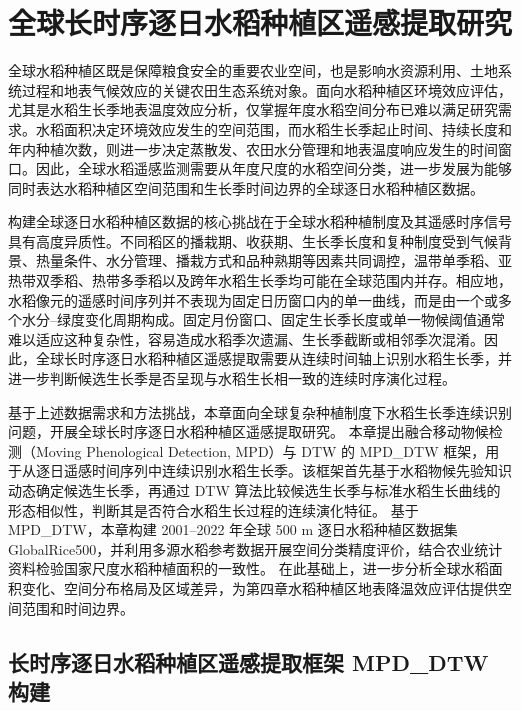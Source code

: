 \chapter{全球长时序逐日水稻种植区遥感提取研究}
全球水稻种植区既是保障粮食安全的重要农业空间，也是影响水资源利用、土地系统过程和地表气候效应的关键农田生态系统对象。面向水稻种植区环境效应评估，尤其是水稻生长季地表温度效应分析，仅掌握年度水稻空间分布已难以满足研究需求。水稻面积决定环境效应发生的空间范围，而水稻生长季起止时间、持续长度和年内种植次数，则进一步决定蒸散发、农田水分管理和地表温度响应发生的时间窗口。因此，全球水稻遥感监测需要从年度尺度的水稻空间分类，进一步发展为能够同时表达水稻种植区空间范围和生长季时间边界的全球逐日水稻种植区数据。

构建全球逐日水稻种植区数据的核心挑战在于全球水稻种植制度及其遥感时序信号具有高度异质性。不同稻区的播栽期、收获期、生长季长度和复种制度受到气候背景、热量条件、水分管理、播栽方式和品种熟期等因素共同调控，温带单季稻、亚热带双季稻、热带多季稻以及跨年水稻生长季均可能在全球范围内并存。相应地，水稻像元的遥感时间序列并不表现为固定日历窗口内的单一曲线，而是由一个或多个水分--绿度变化周期构成。固定月份窗口、固定生长季长度或单一物候阈值通常难以适应这种复杂性，容易造成水稻季次遗漏、生长季截断或相邻季次混淆。因此，全球长时序逐日水稻种植区遥感提取需要从连续时间轴上识别水稻生长季，并进一步判断候选生长季是否呈现与水稻生长相一致的连续时序演化过程。%

基于上述数据需求和方法挑战，本章面向全球复杂种植制度下水稻生长季连续识别问题，开展全球长时序逐日水稻种植区遥感提取研究。%
本章提出融合移动物候检测（Moving Phenological Detection, MPD）与 DTW 的 MPD\_DTW 框架，用于从逐日遥感时间序列中连续识别水稻生长季。该框架首先基于水稻物候先验知识动态确定候选生长季，再通过 DTW 算法比较候选生长季与标准水稻生长曲线的形态相似性，判断其是否符合水稻生长过程的连续演化特征。
基于 MPD\_DTW，本章构建 2001--2022 年全球 500 m 逐日水稻种植区数据集 GlobalRice500，并利用多源水稻参考数据开展空间分类精度评价，结合农业统计资料检验国家尺度水稻种植面积的一致性。
在此基础上，进一步分析全球水稻面积变化、空间分布格局及区域差异，为第四章水稻种植区地表降温效应评估提供空间范围和时间边界。
\clearpage

\section{长时序逐日水稻种植区遥感提取框架 MPD\_DTW 构建}
\label{sec:mpd_dtw}

